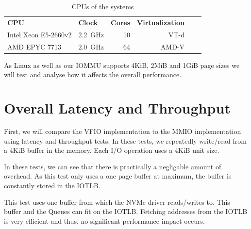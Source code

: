 \begin{table}
    \centering
    \begin{tabular}{llrrrr}
        \multirow{2}{*}{\textbf{CPU}}   & \multirow{2}{*}{\textbf{Clock}}          &
        \multirow{2}{*}{\textbf{Cores}} & \multirow{2}{*}{\textbf{Virtualization}}              \\
                                        &                                          &    &       \\
        \toprule

        Intel Xeon E5-2660v2            & \SI{2.2}{\giga\Hz}                       & 10 & VT-d  \\
        AMD EPYC 7713                   & \SI{2.0}{\giga\Hz}                       & 64 & AMD-V \\

        \bottomrule
    \end{tabular}

    \caption{CPUs of the systems}
    \label{tab:cpus}
\end{table}


As Linux as well as our IOMMU supports 4KiB, 2MiB and 1GiB page sizes we will test and analyse how it affects the overall performance.

\section{Overall Latency and Throughput}
First, we will compare the VFIO implementation to the MMIO implementation using latency and throughput tests. In these tests, we repeatedly write/read from a 4KiB buffer in the memory. Each I/O operation uses a 4KiB unit size.

In these tests, we can see that there is practically a negligable amount of overhead. As this test only uses a one page buffer at maximum, the buffer is constantly stored in the IOTLB.

This test uses one buffer from which the NVMe driver reads/writes to. This buffer and the Queues can fit on the IOTLB. Fetching addresses from the IOTLB is very efficient and thus, no significant performance impact occurs.

